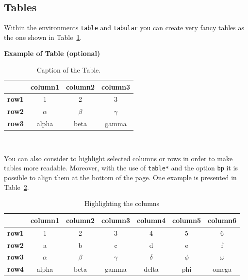 \documentclass[11pt,a4paper]{article}
\begin{document}
\subsection{Tables}
\label{subsec:tables}

Within the environments \texttt{table} and  \texttt{tabular} you can create very fancy tables as the one shown in Table~\ref{table:example}.

\begin{table}[H]
\caption*{\textbf{Example of Table (optional)}}
\centering
\begin{tabular}{|p{3em} c c c |}
\hline
\rowcolor{bluePoli!40}
& \textbf{column1} & \textbf{column2} & \textbf{column3} \T\B \\
\hline \hline
\textbf{row1} & 1 & 2 & 3 \T\B \\
\textbf{row2} & $\alpha$ & $\beta$ & $\gamma$ \T\B\\
\textbf{row3} & alpha & beta & gamma \B\\
\hline
\end{tabular}
\\[10pt]
\caption{Caption of the Table.}
\label{table:example}
\end{table}

You can also consider to highlight selected columns or rows in order to make tables more readable.
Moreover, with the use of \texttt{table*} and the option \texttt{bp} it is possible to align them at the bottom of the page. One example is presented in Table~\ref{table:exampleC}.

\begin{table}[bp]
\centering
\begin{tabular}{|p{3em} | c | c | c | c | c | c|}
\hline
& \textbf{column1} & \textbf{column2} & \textbf{column3} & \textbf{column4} & \textbf{column5} & \textbf{column6} \T\B \\
\hline \hline
\textbf{row1} & 1 & 2 & 3 & 4 & 5 & 6 \T\B\\
\textbf{row2} & a & b & c & d & e & f \T\B\\
\textbf{row3} & $\alpha$ & $\beta$ & $\gamma$ & $\delta$ & $\phi$ & $\omega$ \T\B\\
\textbf{row4} & alpha & beta & gamma & delta & phi & omega \B\\
\hline
\end{tabular}
\\[10pt]
\caption{Highlighting the columns}
\label{table:exampleC}
\end{table}
\end{document}

